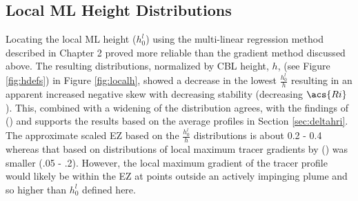 \subsection{Local \acs{ML} Height Distributions}

Locating the local \acs{ML} height ($h^{l}_{0}$) using the multi-linear regression method described in Chapter 2 proved more reliable than the gradient method discussed above.  The resulting distributions, normalized by \acs{CBL} height, $h$, (see Figure \ref{fig:hdefs}) in Figure \ref{fig:localh},  showed a decrease in the lowest $\frac{h^{l}_{0}}{h}$ resulting in an apparent increased negative skew with decreasing stability (decreasing $\acs{Ri}$). This, combined with a widening of the distribution agrees, with the findings of \citeauthor{SullMoengStev} (\citeyear{SullMoengStev}) and supports the results based on the average profiles in Section \ref{sec:deltahri}.  The approximate scaled \acs{EZ} based on the $\frac{h^{l}_{0}}{h}$ distributions is about 0.2 - 0.4 whereas that based on distributions of local maximum tracer gradients by  \citeauthor{BrooksFowler2} (\citeyear{BrooksFowler2}) was smaller (.05 - .2).  However, the local maximum gradient of the tracer profile would likely be within the \acs{EZ} at points outside an actively impinging plume and so higher than $h^{l}_{0}$ defined here. \\  


